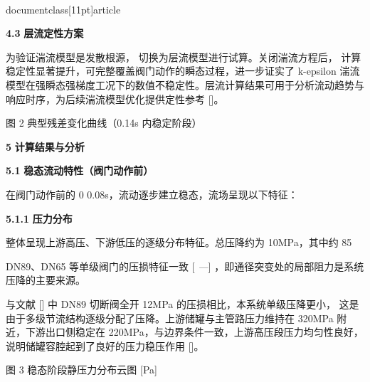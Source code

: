 \\documentclass[11pt]{article}
\begin{document}
\par
\textbf{4.3    }\textbf{层流定性方案}\par

为验证湍流模型是发散根源， 切换为层流模型进行试算。关闭湍流方程后， 计算稳定性显著提升，可完整覆盖阀门动作的瞬态过程，进一步证实了 k-epsilon 湍流模型在强瞬态强梯度工况下的数值不稳定性。层流计算结果可用于分析流动趋势与响应时序，为后续湍流模型优化提供定性参考 [\cite{fe880629_9ce4_4876_a173_e24a97d827f4_基于数字孪生的管道阀门监测技术研究_谭宗豪}]。\par

\par
\par
图 2    典型残差变化曲线（0.14s  内稳定阶段）\par

\par
\par
\textbf{5    }\textbf{计算结果与分析}\par

\par
\textbf{5.1    }\textbf{稳态流动特性（阀门动作前）}\par

在阀门动作前的 0 0.08s，流动逐步建立稳态，流场呈现以下特征：\par

\par
\textbf{5.1.1    }\textbf{压力分布}\par

整体呈现上游高压、下游低压的逐级分布特征。总压降约为 10MPa，其中约 85\\%

\par
DN89、DN65 等单级阀门的压损特征一致 [ \textit{—}] ，即通径突变处的局部阻力是系统压降的主要来源。\par

与文献 [\cite{fe880629_9ce4_4876_a173_e24a97d827f4_基于数字孪生的管道阀门监测技术研究_谭宗豪}]   中 DN89 切断阀全开 12MPa 的压损相比，本系统单级压降更小， 这是由于多级节流结构逐级分配了压降。上游储罐与主管路压力维持在 320MPa 附近，下游出口侧稳定在 220MPa，与边界条件一致，上游高压段压力均匀性良好，说明储罐容腔起到了良好的压力稳压作用 [\cite{fe880629_9ce4_4876_a173_e24a97d827f4_基于数字孪生的管道阀门监测技术研究_谭宗豪}]。\par

\par
图 3    稳态阶段静压力分布云图 [Pa]\par
\end{document}
